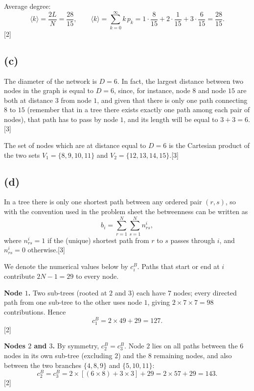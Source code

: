 \documentclass[11pt,a4paper]{article}
\newcommand{\mk}[1]{\hfill{\small[#1]}}
\begin{document}
\noindent Average degree:
\[
  \langle k \rangle = \frac{2L}{N} = \frac{28}{15},
  \qquad
  \langle k \rangle = \sum_{k=0}^{\infty} k\, p_k
  = 1 \cdot \frac{8}{15} + 2 \cdot \frac{1}{15} + 3 \cdot \frac{6}{15}
  = \frac{28}{15}.
\]
\noindent\mbox{}\hfill{\small[2]}

\subsection*{(c)}

\noindent The diameter of the network is $D = 6$. In fact, the largest distance between two nodes in the graph is equal to $D = 6$, since, for instance, node $8$ and node $15$ are both at distance $3$ from node $1$, and given that there is only one path connecting $8$ to $15$ (remember that in a tree there exists exactly one path among each pair of nodes), that path has to pass by node $1$, and its length will be equal to $3 + 3 = 6$.\mk{3}

\noindent The set of nodes which are at distance equal to $D = 6$ is the Cartesian product of the two sets $V_1 = \{8, 9, 10, 11\}$ and $V_2 = \{12, 13, 14, 15\}$.\mk{3}

\subsection*{(d)}

\noindent In a tree there is only one shortest path between any ordered pair $(r,s)$, so with the convention used in the problem sheet the betweenness can be written as
\[
  b_i = \sum_{r=1}^{N} \sum_{s=1}^{N} n_{rs}^{i},
\]
where $n_{rs}^{i} = 1$ if the (unique) shortest path from $r$ to $s$ passes through $i$, and $n_{rs}^{i} = 0$ otherwise.\mk{3}

\noindent We denote the numerical values below by $c_i^{B}$. Paths that start or end at $i$ contribute $2N - 1 = 29$ to every node.

\medskip
\noindent\textbf{Node $1$.}
Two sub-trees (rooted at $2$ and $3$) each have $7$ nodes; every directed path from one sub-tree to the other uses node $1$, giving $2 \times 7 \times 7 = 98$ contributions. Hence
\[
  c_1^{B} = 2 \times 49 + 29 = 127.
\]
\noindent\mbox{}\hfill{\small[2]}

\noindent\textbf{Nodes $2$ and $3$.}
By symmetry, $c_2^{B} = c_3^{B}$. Node $2$ lies on all paths between the $6$ nodes in its own sub-tree (excluding $2$) and the $8$ remaining nodes, and also between the two branches $\{4,8,9\}$ and $\{5,10,11\}$:
\[
  c_2^{B} = c_3^{B} = 2 \times [(6 \times 8) + 3 \times 3] + 29 = 2 \times 57 + 29 = 143.
\]
\noindent\mbox{}\hfill{\small[2]}
\end{document}
